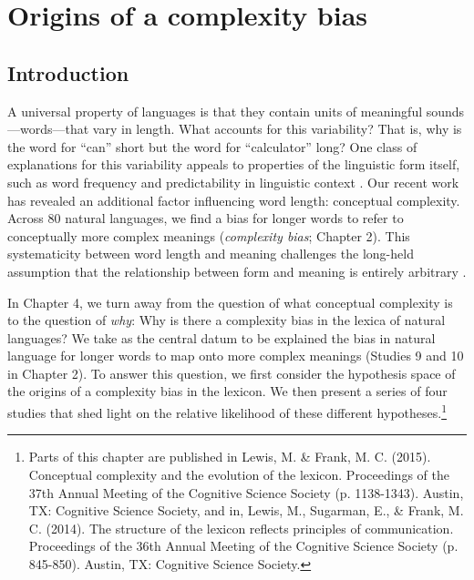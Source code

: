 
\chapter{Origins of a complexity bias}
\label{chapter:origins}

\section{Introduction}

A universal property of languages is that they contain units of meaningful sounds---words---that vary in length. What accounts for this variability? That is, why is the word for ``can'' short but the word for ``calculator'' long? One class of explanations for this variability appeals to properties of the linguistic form itself, such as word frequency \cite{zipf1936} and predictability in linguistic context \cite{piantadosi2011a,mahowald2013info}. Our recent work has revealed an additional factor influencing word length: conceptual complexity. Across 80 natural languages, we find a bias for longer words to refer to conceptually more complex meanings ({\it complexity bias}; Chapter 2). This systematicity between word length and meaning challenges the long-held assumption that the relationship between form and meaning is entirely arbitrary \cite{saussure}.

In Chapter 4, we turn away from the question of what conceptual complexity is to the question of {\it why}: Why is there a complexity bias in the lexica of natural languages? We take as the central datum to be explained the bias in natural language for longer words to map onto more complex meanings (Studies 9 and 10 in Chapter 2).  To answer this question, we first consider the hypothesis space of the origins of a complexity bias in the lexicon. We then present a series of four studies that shed light on the relative likelihood of these different hypotheses.\footnote{Parts of this chapter are published in  Lewis, M. \& Frank, M. C. (2015). Conceptual complexity and the evolution of the lexicon. Proceedings of the 37th Annual Meeting of the Cognitive Science Society (p. 1138-1343). Austin, TX: Cognitive Science Society, and in,  Lewis, M., Sugarman, E., \& Frank, M. C. (2014). The structure of the lexicon reflects principles of communication. Proceedings of the 36th Annual Meeting of the Cognitive Science Society (p. 845-850). Austin, TX: Cognitive Science Society.}


